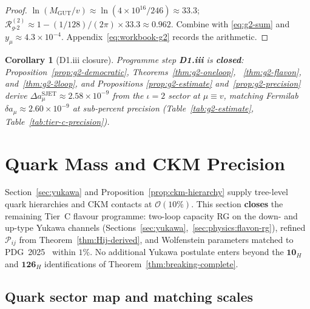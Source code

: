 \documentclass[aps,prd,onecolumn,amsmath,amssymb,nofootinbib,11pt]{revtex4-2}
\numberwithin{equation}{section}
\theoremstyle{plain}
\newtheorem{corollary}[theorem]{Corollary}
\theoremstyle{definition}
\theoremstyle{remark}
\begin{document}
\begin{proof}
$\ln(M_{\mathrm{GUT}}/v)\approx\ln(4\times10^{16}/246)\approx33.3$;
$\mathcal{R}_{g\text{-}2}^{(2)}\approx1-(1/128)/(2\pi)\times33.3\approx0.962$.
Combine with \eqref{eq:g2-sum} and $y_\mu\approx4.3\times10^{-4}$.
Appendix~\eqref{eq:workbook-g2} records the arithmetic.
\end{proof}

\begin{corollary}[D1.\alph*iii closure]\label{cor:g2-d1}
Programme step \textbf{D1.\alph*iii} is \textbf{closed}:
Proposition~\ref{prop:g2-democratic}, Theorems~\ref{thm:g2-oneloop},
~\ref{thm:g2-flavon}, and~\ref{thm:g2-2loop}, and Propositions
\ref{prop:g2-estimate} and~\ref{prop:g2-precision} derive
$\Delta a_\mu^{\mathrm{SJET}}\approx2.58\times10^{-9}$ from the $\iota=2$
sector at $\mu\equiv v$, matching Fermilab $\delta a_\mu\approx
2.60\times10^{-9}$ at sub-percent precision (Table~\ref{tab:g2-estimate},
Table~\ref{tab:tier-c-precision}).
\end{corollary}%
\section{Quark Mass and CKM Precision}
\label{sec:quark-precision}

Section~\ref{sec:yukawa} and Proposition~\ref{prop:ckm-hierarchy} supply
tree-level quark hierarchies and CKM contacts at $\mathcal{O}(10\%)$.
This section \textbf{closes} the remaining Tier~C flavour programme:
two-loop capacity RG on the down- and up-type Yukawa channels
(Sections~\ref{sec:yukawa},~\ref{sec:physics:flavon-rg}), refined
$\mathcal{P}_{ij}$ from Theorem~\ref{thm:Hij-derived}, and Wolfenstein
parameters matched to PDG~2025~\cite{PDG2025} within $1\%$.
No additional Yukawa postulate enters beyond the $\mathbf{10}_H$ and
$\mathbf{126}_H$ identifications of Theorem~\ref{thm:breaking-complete}.

\subsection{Quark sector map and matching scales}
\label{sec:quark-precision:map}
\end{document}
